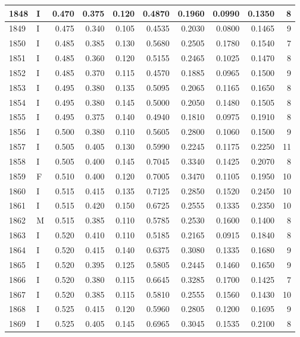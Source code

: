 \documentclass[9pt,twocolumn,twoside,]{pnas-new}
\begin{document}
\begin{tabular}{l|l|r|r|r|r|r|r|r|r}
\hline
1848 & I & 0.470 & 0.375 & 0.120 & 0.4870 & 0.1960 & 0.0990 & 0.1350 & 8\\
\hline
1849 & I & 0.475 & 0.340 & 0.105 & 0.4535 & 0.2030 & 0.0800 & 0.1465 & 9\\
\hline
1850 & I & 0.485 & 0.385 & 0.130 & 0.5680 & 0.2505 & 0.1780 & 0.1540 & 7\\
\hline
1851 & I & 0.485 & 0.360 & 0.120 & 0.5155 & 0.2465 & 0.1025 & 0.1470 & 8\\
\hline
1852 & I & 0.485 & 0.370 & 0.115 & 0.4570 & 0.1885 & 0.0965 & 0.1500 & 9\\
\hline
1853 & I & 0.495 & 0.380 & 0.135 & 0.5095 & 0.2065 & 0.1165 & 0.1650 & 8\\
\hline
1854 & I & 0.495 & 0.380 & 0.145 & 0.5000 & 0.2050 & 0.1480 & 0.1505 & 8\\
\hline
1855 & I & 0.495 & 0.375 & 0.140 & 0.4940 & 0.1810 & 0.0975 & 0.1910 & 8\\
\hline
1856 & I & 0.500 & 0.380 & 0.110 & 0.5605 & 0.2800 & 0.1060 & 0.1500 & 9\\
\hline
1857 & I & 0.505 & 0.405 & 0.130 & 0.5990 & 0.2245 & 0.1175 & 0.2250 & 11\\
\hline
1858 & I & 0.505 & 0.400 & 0.145 & 0.7045 & 0.3340 & 0.1425 & 0.2070 & 8\\
\hline
1859 & F & 0.510 & 0.400 & 0.120 & 0.7005 & 0.3470 & 0.1105 & 0.1950 & 10\\
\hline
1860 & I & 0.515 & 0.415 & 0.135 & 0.7125 & 0.2850 & 0.1520 & 0.2450 & 10\\
\hline
1861 & I & 0.515 & 0.420 & 0.150 & 0.6725 & 0.2555 & 0.1335 & 0.2350 & 10\\
\hline
1862 & M & 0.515 & 0.385 & 0.110 & 0.5785 & 0.2530 & 0.1600 & 0.1400 & 8\\
\hline
1863 & I & 0.520 & 0.410 & 0.110 & 0.5185 & 0.2165 & 0.0915 & 0.1840 & 8\\
\hline
1864 & I & 0.520 & 0.415 & 0.140 & 0.6375 & 0.3080 & 0.1335 & 0.1680 & 9\\
\hline
1865 & I & 0.520 & 0.395 & 0.125 & 0.5805 & 0.2445 & 0.1460 & 0.1650 & 9\\
\hline
1866 & I & 0.520 & 0.380 & 0.115 & 0.6645 & 0.3285 & 0.1700 & 0.1425 & 7\\
\hline
1867 & I & 0.520 & 0.385 & 0.115 & 0.5810 & 0.2555 & 0.1560 & 0.1430 & 10\\
\hline
1868 & I & 0.525 & 0.415 & 0.120 & 0.5960 & 0.2805 & 0.1200 & 0.1695 & 9\\
\hline
1869 & I & 0.525 & 0.405 & 0.145 & 0.6965 & 0.3045 & 0.1535 & 0.2100 & 8\\

\end{tabular}
\end{document}
